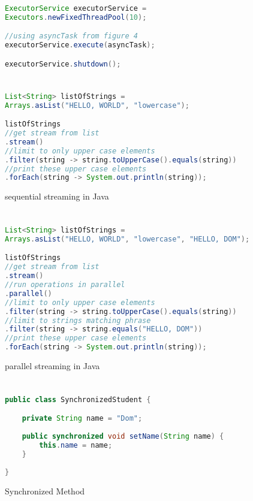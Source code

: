 \documentclass[]{report}
\begin{document}
\chapter{}
\begin{figure}[h!]
\caption{}
\begin{lstlisting}[language=Java,frame=single]

ExecutorService executorService = 
Executors.newFixedThreadPool(10);

//using asyncTask from figure 4
executorService.execute(asyncTask);

executorService.shutdown();
\end{lstlisting}
\end{figure}

\chapter{}
\begin{figure}[h!]
\caption{sequential streaming in Java}
\begin{lstlisting}[language=Java,frame=single]
List<String> listOfStrings = 
Arrays.asList("HELLO, WORLD", "lowercase");

listOfStrings
//get stream from list
.stream()
//limit to only upper case elements
.filter(string -> string.toUpperCase().equals(string))
//print these upper case elements
.forEach(string -> System.out.println(string));
\end{lstlisting}
\end{figure}

\chapter{}
\begin{figure}[h!]
\caption{parallel streaming in Java}
\begin{lstlisting}[language=Java,frame=single]
List<String> listOfStrings = 
Arrays.asList("HELLO, WORLD", "lowercase", "HELLO, DOM");

listOfStrings
//get stream from list
.stream()
//run operations in parallel
.parallel()
//limit to only upper case elements
.filter(string -> string.toUpperCase().equals(string))
//limit to strings matching phrase
.filter(string -> string.equals("HELLO, DOM"))
//print these upper case elements
.forEach(string -> System.out.println(string));
\end{lstlisting}
\end{figure}

\chapter{}
\begin{figure}[h!]
\caption{Synchronized Method}
\begin{lstlisting}[language=Java,frame=single]
public class SynchronizedStudent {

	private String name = "Dom";
	
	public synchronized void setName(String name) {
		this.name = name;
	}
	
}
\end{lstlisting}
\end{figure}
\end{document}
